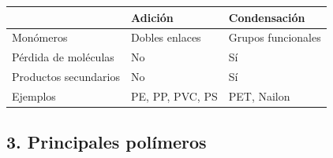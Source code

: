 \begin{center}

\renewcommand{\arraystretch}{1.35}

\begin{tabular}{p{4.3cm}p{4.2cm}p{4cm}}

\toprule

&

\textbf{Adición}

&

\textbf{Condensación}

\\

\midrule

Monómeros

&

Dobles enlaces

&

Grupos funcionales

\\

Pérdida de moléculas

&

No

&

Sí

\\

Productos secundarios

&

No

&

Sí

\\

Ejemplos

&

PE, PP, PVC, PS

&

PET, Nailon

\\

\bottomrule

\end{tabular}

\end{center}


\subsection*{3. Principales polímeros}

